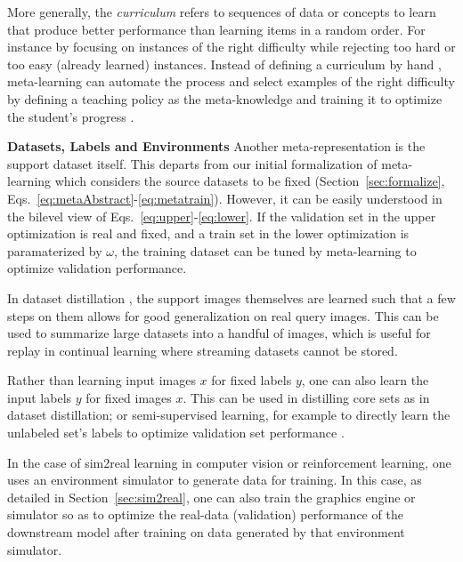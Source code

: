 \documentclass[10pt,journal,compsoc]{IEEEtran}
\newcommand{\keypoint}[1]{\vspace{0.1cm}\noindent\textbf{#1}\quad}
\begin{document}
More generally, the \emph{curriculum} \cite{elman1993startingsmall} refers to sequences of data or concepts to learn that produce better performance than learning items in a random order. For instance by focusing on instances of the right difficulty while rejecting too hard or too easy (already learned) instances. Instead of defining a curriculum by hand  \cite{bengio2009curriculumlearning}, meta-learning can automate the process and select examples of the right difficulty by defining a teaching policy as the meta-knowledge and training it to optimize the student's progress  \cite{jiang2018mentornet,fan2018learnteach}.




\keypoint{Datasets, Labels and Environments}
Another meta-representation is the support dataset itself. This departs from our initial formalization of meta-learning which considers the source datasets to be fixed (Section~\ref{sec:formalize}, Eqs.~\ref{eq:metaAbstract}-\ref{eq:metatrain}). However, it can be easily understood in the bilevel view of Eqs.~\ref{eq:upper}-\ref{eq:lower}. If the validation set in the upper optimization is real and fixed, and a train set in the lower optimization is paramaterized by $\omega$, the training dataset can be tuned by meta-learning to optimize validation performance.

In dataset distillation \cite{wang2018datasetdistill, lorraine2019optmillionsofhyperparams}, the support images themselves are learned such that a few steps on them allows for good generalization on real query images. This can be used to summarize large datasets into a handful of images, which is useful for replay in continual learning where streaming datasets cannot be stored.

Rather than learning input images $x$ for fixed labels $y$, one can also learn the input labels $y$ for fixed images $x$. This can be used in distilling core sets \cite{bohdal2020flexible} as in dataset distillation; or semi-supervised learning, for example to directly learn the unlabeled set's labels to optimize validation set performance \cite{weihong2019learn2impute, sun2019learning}.

In the case of sim2real learning \cite{openai2018learning} in computer vision or reinforcement learning, one uses an environment simulator to generate data for training. In this case, as detailed in Section~\ref{sec:sim2real}, one can also train the graphics engine \cite{ruiz2019learn2sim} or simulator \cite{vuong2019howtorandomize} so as to optimize the real-data (validation) performance of the downstream model after training on data generated by that environment simulator.
\end{document}
